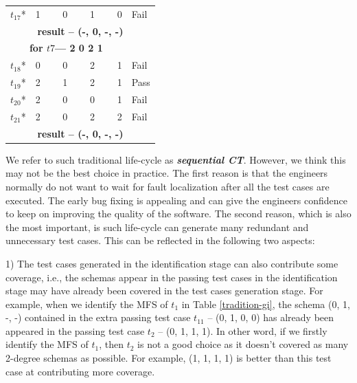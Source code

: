 \documentclass{sig-alternate}
\begin{document}
\begin{table}[h]
\begin{tabular}{llllll}
$t_{17}$* &\multicolumn{4}{l}{1  \ \ \ \  0 \ \ \ \  1  \ \ \ \ 0} & Fail \\
\multicolumn{6}{c}{\bfseries result --  (-, 0, -, -)}  \\
\multicolumn{5}{c}{\bfseries for $t7$--- 2 0 2 1} &  \\
$t_{18}$* &\multicolumn{4}{l}{0  \ \ \ \  0 \ \ \ \  2 \ \ \ \  1} & Fail \\
$t_{19}$* &\multicolumn{4}{l}{2  \ \ \ \  1 \ \ \ \  2 \ \ \ \  1} & Pass \\
$t_{20}$* &\multicolumn{4}{l}{2  \ \ \ \  0 \ \ \ \  0  \ \ \ \ 1} & Fail \\
$t_{21}$* &\multicolumn{4}{l}{2  \ \ \ \  0 \ \ \ \  2  \ \ \ \ 2} & Fail \\
\multicolumn{6}{c}{\bfseries result --  (-, 0, -, -)}  \\
\hline
\end{tabular}
\end{table}

We refer to such traditional life-cycle as \emph{\textbf{sequential CT}}. However, we think this may not be the best choice in practice. The first reason is that the engineers normally do not want to wait for fault localization after all the test cases are executed. The early bug fixing is appealing and can give the engineers confidence to keep on improving the quality of the software. The second reason, which is also the most important, is such life-cycle can generate many redundant and unnecessary test cases. This can be reflected in the following two aspects:

1) The test cases generated in the identification stage can also contribute some coverage, i.e., the schemas appear in the passing test cases in the identification stage may have already been covered in the test cases generation stage.  For example, when we identify the MFS of $t_{1}$ in Table \ref{tradition-gi}, the schema (0, 1, -, -) contained in the extra passing test case $t_{11}$ -- (0, 1, 0, 0) has already been appeared in the passing test case $t_{2}$ -- (0, 1, 1, 1). In other word, if we firstly identify the MFS of $t_{1}$, then $t_{2}$ is not a good choice as it doesn't covered as many 2-degree schemas as possible. For example, (1, 1, 1, 1) is better than this test case at contributing more coverage.
\end{document}
